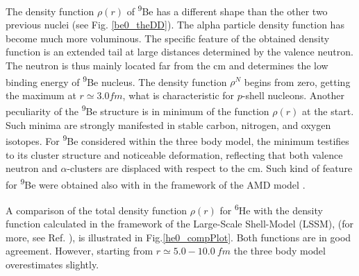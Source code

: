 \documentclass[
12pt, %
oneside, %
english, %
doublespacing, %
doublespacing, %
toctotoc, %
parskip, %
headsepline, %
]{MastersDoctoralThesis} %
\newcommand{\he}{\textsuperscript{6}He\xspace}
\newcommand{\be}{\textsuperscript{9}Be\xspace}
\begin{document}
The density function $\rho(r)$ of \be has a different shape than the other two previous nuclei (see Fig. \ref{be0_theDD}). The alpha particle density function has become much more voluminous. 
The specific feature of the obtained density function is an extended tail at large distances determined by the valence neutron. The neutron is thus mainly located far from the cm and determines the low binding energy of \be nucleus.
The density function $\rho^N$ begins from zero, getting the maximum at $r\simeq 3.0 fm$, what is characteristic for $p$-shell nucleons.
Another peculiarity of the \be structure is in minimum of the function $\rho(r)$ at the start. 
Such minima are strongly manifested in stable carbon, nitrogen,
and oxygen isotopes. For \be considered
within the three body model, the minimum testifies to its
cluster structure and noticeable deformation, reflecting that both  valence neutron and  $\alpha$-clusters are
displaced with respect to the cm.
 Such kind of feature for \be were obtained also with in the framework of the AMD model \cite{hirai2011clustering}. 

A comparison of the total density function $\rho(r)$ for \he with the density function calculated in the framework of the Large-Scale Shell-Model (LSSM), (for more, see Ref. \cite{antonov2005charge}), is illustrated in Fig.\ref{he0_compPlot}. Both functions are in good agreement. However, starting from $r \simeq 5.0-10.0~fm$ the three body model overestimates slightly. 
\end{document}
